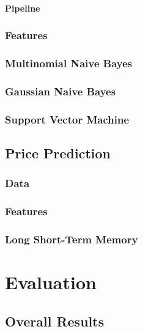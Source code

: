 \documentclass[12pt,a4paper,twoside,openright]{report}
\begin{document}
\subsubsection{Pipeline}
\label{sec:impPipeline}


\subsection{Features}
\label{sec:impSentiFeat}

\subsection{Multinomial Naive Bayes}
\label{sec:impMNB}

\subsection{Gaussian Naive Bayes}
\label{sec:impGNB}

\subsection{Support Vector Machine}
\label{sec:impSVM}

\section{Price Prediction}
\label{sec:impFin}

\subsection{Data}
\label{sec:impFinData}

\subsection{Features}
\label{sec:impFinFeat}

\subsection{Long Short-Term Memory}
\label{sec:ImplLSTM}

\chapter{Evaluation}

\section{Overall Results}
\end{document}
